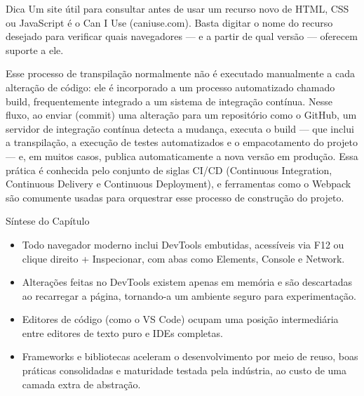 \begin{infobox}{Dica}
Um site útil para consultar antes de usar um recurso novo de HTML, CSS ou JavaScript é o Can I Use (caniuse.com). Basta digitar o nome do recurso desejado para verificar quais navegadores — e a partir de qual versão — oferecem suporte a ele.
\end{infobox}

Esse processo de transpilação normalmente não é executado manualmente a cada alteração de código: ele é incorporado a um processo automatizado chamado build, frequentemente integrado a um sistema de integração contínua. Nesse fluxo, ao enviar (commit) uma alteração para um repositório como o GitHub, um servidor de integração contínua detecta a mudança, executa o build — que inclui a transpilação, a execução de testes automatizados e o empacotamento do projeto — e, em muitos casos, publica automaticamente a nova versão em produção. Essa prática é conhecida pelo conjunto de siglas CI/CD (Continuous Integration, Continuous Delivery e Continuous Deployment), e ferramentas como o Webpack são comumente usadas para orquestrar esse processo de construção do projeto.

Síntese do Capítulo

\begin{itemize}
  \item Todo navegador moderno inclui DevTools embutidas, acessíveis via F12 ou clique direito + Inspecionar, com abas como Elements, Console e Network.
\end{itemize}

\begin{itemize}
  \item Alterações feitas no DevTools existem apenas em memória e são descartadas ao recarregar a página, tornando-a um ambiente seguro para experimentação.
\end{itemize}

\begin{itemize}
  \item Editores de código (como o VS Code) ocupam uma posição intermediária entre editores de texto puro e IDEs completas.
\end{itemize}

\begin{itemize}
  \item Frameworks e bibliotecas aceleram o desenvolvimento por meio de reuso, boas práticas consolidadas e maturidade testada pela indústria, ao custo de uma camada extra de abstração.
\end{itemize}

